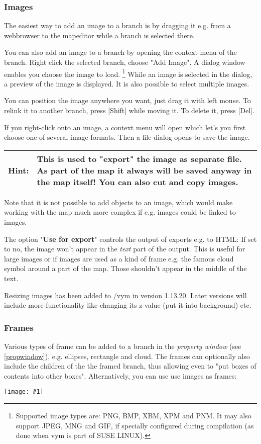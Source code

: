 \documentclass[12pt,a4paper]{article}
\newlength{\maximgwidth}
\newcommand{\maximage}[1]{  
    \begin{center}
        \texttt{[image: \#1]} 
    \end{center}
}
\newcommand{\hint}[1]{
    \begin{center} 
        \begin{tabular}{|rp{12cm}|} \hline
            {\bf Hint}:& #1\\   \hline
        \end{tabular}
            \marginpar{\Huge !} 
    \end{center} 
}
\newcommand{\vym}{{\sc vym }}
\newcommand{\key}[1]{[#1]}
\begin{document}
\subsubsection*{Images}
The easiest way to add an image to a branch is by dragging it e.g. from a
webbrowser to the mapeditor while a branch is selected there.

You can also add an image to a branch by opening the context menu of the
branch. Right click the selected branch, choose "Add Image". A dialog
window enables you choose the image to load. 
\footnote{Supported image types are: PNG, BMP, XBM, XPM and PNM. It may
    also support JPEG, MNG and GIF, if specially configured during
    compilation (as done when \vym is part of SUSE LINUX).}
While an image is selected in the dialog, a preview of the image is
displayed. It is also possible to select multiple images.  

You can position the image anywhere you want, just drag it with left
mouse. To relink it to another branch, press \key{Shift} while moving
it. To delete it, press \key{Del}. 

If you right-click onto an image, a context menu will open which let's
you first choose one of several image formats. Then a file dialog opens
to save the image. 

\hint{ This is used to "export" the image as separate file. As part of
the map it always will be
saved anyway in the map itself! You can also cut and
copy images.}
Note that it is not possible to add objects to an image, which would
make working with the map much more complex if e.g. images could be
linked to images.

The option "{\bf Use for export}" controls the output of exports
e.g. to HTML: If set to no, the image won't appear in the {\em text}
part of the output. This is useful for large images or if images are
used as a kind of frame e.g. the famous cloud symbol around a part of
the map. Those shouldn't appear in the middle of the text.

Resizing images has been added to /vym in version 1.13.20. Later
versions will include more functionality like 
changing its z-value (put it into background) etc.

\subsubsection*{Frames}
Various types of frame can be added to a branch in the {\em property window} (see
\ref{propwindow}), e.g. ellipses, rectangle and cloud. The frames can
optionally also include the children of the the framed branch, thus
allowing even to "put boxes of contents into other boxes".
Alternatively, you can use use images as frames: 
\maximage{images/frames.png}
\end{document}
